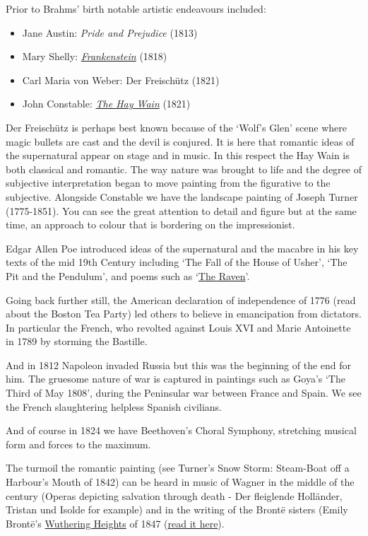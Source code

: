 Prior to Brahms' birth notable artistic endeavours included:
\begin{itemize}
\item Jane Austin: \textit{Pride and Prejudice} (1813)
\item Mary Shelly: \textit{\href{http://www.gutenberg.org/files/84/84-h/84-h.htm}{Frankenstein}} (1818)
\item Carl Maria von Weber: Der Freisch\"utz (1821)
\item John Constable: \textit{\href{http://www.nationalgallery.org.uk/paintings/john-constable-the-hay-wain}{The Hay Wain}} (1821)  
\end{itemize}

Der Freisch\"utz is perhaps best known because of the `Wolf's Glen' scene where magic bullets are cast and the devil is conjured. It is here that romantic ideas of the supernatural appear on stage and in music. In this respect the Hay Wain is both classical and romantic. The way nature was brought to life and the degree of subjective interpretation began to move painting from the figurative to the subjective. Alongside Constable we have the landscape painting of Joseph Turner (1775-1851). You can see the great attention to detail and figure but at the same time, an approach to colour that is bordering on the impressionist. 

Edgar Allen Poe introduced ideas of the supernatural and the macabre in his key texts of the mid 19th Century including `The Fall of the House of Usher', `The Pit and the Pendulum', and poems such as `\href{https://www.youtube.com/watch?v=0K6-wO94-6I}{The Raven}'.  

Going back further still, the American declaration of independence of 1776 (read about the Boston Tea Party) led others to believe in emancipation from dictators. In particular the French, who revolted against Louis XVI and Marie Antoinette in 1789 by storming the Bastille. 

And in 1812 Napoleon invaded Russia but this was the beginning of the end for him. The gruesome nature of war is captured in paintings such as Goya's `The Third of May 1808', during the Peninsular war between France and Spain. We see the French slaughtering helpless Spanish civilians.   

And of course in 1824 we have Beethoven's Choral Symphony, stretching musical form and forces to the maximum. 

The turmoil the romantic painting (see Turner's Snow Storm: Steam-Boat off a Harbour's Mouth of 1842) can be heard in music of Wagner in the middle of the century (Operas depicting salvation through death - Der fleiglende Holl\"ander, Tristan und Isolde for example) and in the writing of the Bront\"e sisters (Emily Bront\"e's \href{http://www.wuthering-heights.co.uk/index.php}{Wuthering Heights} of 1847 (\href{http://www.gutenberg.org/ebooks/768}{read it here}).

